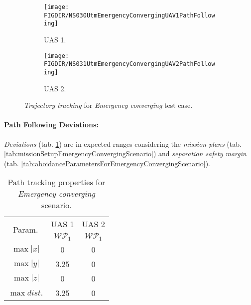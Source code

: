\begin{figure}[H]
    \centering
    \begin{subfigure}{0.48\textwidth}
    	\centering
        \texttt{[image: \\FIGDIR/NS030UtmEmergencyConvergingUAV1PathFollowing]}
        \caption{UAS 1.}
        \label{fig:emergencyConvergingUAS1PathTracking}
    \end{subfigure}
    \begin{subfigure}{0.48\textwidth}
	    \centering
        \texttt{[image: \\FIGDIR/NS031UtmEmergencyConvergingUAV2PathFollowing]} 
        \caption{UAS 2.}
        \label{fig:emergencyCovnergingUAS2PathTracking}
    \end{subfigure}
    \caption{\emph{Trajectory tracking} for \emph{Emergency converging} test case. }
    \label{fig:emergencyConvergingTrajectoryTrackingPerformance}
\end{figure}

\paragraph{Path Following Deviations:} \emph{Deviations} (tab. \ref{tab:pathTrackingParametersForEmergencyConverging}) are in expected ranges considering the  \emph{mission plans} (tab. \ref{tab:missionSetupEmergencyConvergingScenario}) and \emph{separation safety margin} (tab. \ref{tab:aboidanceParametersForEmergencyConvergingScenario}).
    
\begin{table}[H]
    \centering
    \begin{tabular}{c||c|c}
        \multirow{2}{*}{Param.} & UAS 1     & UAS 2\\\cline{2-3}
                        & $\mathscr{WP}_1$  & $\mathscr{WP}_1$\\\hline\hline
          $\max |x|$    & 0                 & 0 \\\hline
          $\max |y|$    & 3.25              & 0 \\\hline
          $\max |z|$    & 0                 & 0 \\\hline
          $\max dist.$  & 3.25              & 0 \\
    \end{tabular}
    \caption{Path tracking properties for \emph{Emergency converging} scenario.}
    \label{tab:pathTrackingParametersForEmergencyConverging}
\end{table}


